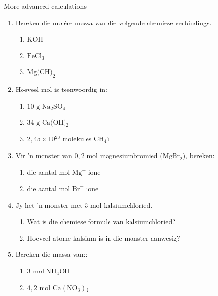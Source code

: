             \begin{exercises}{  More advanced calculations }
            \nopagebreak \noindent
      \label{m38717*id279756}\begin{enumerate}[noitemsep, label=\textbf{\arabic*}. ] 
            \label{m38717*uid47}\item Bereken die mol\^{e}re massa van die volgende chemiese verbindings:
\label{m38717*id279772}\begin{enumerate}[noitemsep, label=\textbf{\alph*}. ] 
            \label{m38717*uid48}\item $\text{KOH}$
\label{m38717*uid49}\item $\text{FeCl}{}_{3}$
\label{m38717*uid50}\item ${\text{Mg(OH)}}_{2}$
\end{enumerate}
                \label{m38717*uid51}\item Hoeveel mol is teenwoordig in:
\label{m38717*id279848}\begin{enumerate}[noitemsep, label=\textbf{\alph*}. ] 
            \label{m38717*uid52}\item $10 \text{ g}$ $\text{Na}_{2}\text{SO}{}_{4}$
\label{m38717*uid53}\item $34 \text{ g}$ $\text{Ca(OH)}{}_{2}$
\label{m38717*uid54}\item $2,45 \times 10{}^{23}$ molekules $\text{CH}{}_{4}$?
\end{enumerate}
                \label{m38717*uid55}\item Vir 'n monster van $0,2 \text{ mol}$ magnesiumbromied ($\text{MgBr}_{2}$), bereken:
\label{m38717*id279964}\begin{enumerate}[noitemsep, label=\textbf{\alph*}. ] 
            \label{m38717*uid56}\item die aantal mol ${\text{Mg}}^{+}$ ione
\label{m38717*uid57}\item die aantal mol ${\text{Br}}^{-}$ ione
\end{enumerate}
                \label{m38717*uid58}\item Jy het 'n monster met $3 \text{ mol}$ kalsiumchloried.
\label{m38717*id280031}\begin{enumerate}[noitemsep, label=\textbf{\alph*}. ] 
            \label{m38717*uid59}\item Wat is die chemiese formule van kalsiumchloried?
\label{m38717*uid60}\item Hoeveel atome kalsium is in die monster aanwesig?
\end{enumerate}
               \label{m38717*uid61}\item Bereken die massa van::
\label{m38717*id280072}\begin{enumerate}[noitemsep, label=\textbf{\alph*}. ] 
            \label{m38717*uid62}\item $3\text{ mol}$ $\text{NH}{}_{4}\text{OH}$
\label{m38717*uid63}\item $4,2 \text{ mol}$ $\text{Ca}\left(\text{NO}{}_{3}\right){}_{2}$\end{enumerate}


\end{enumerate}
\end{exercises}

